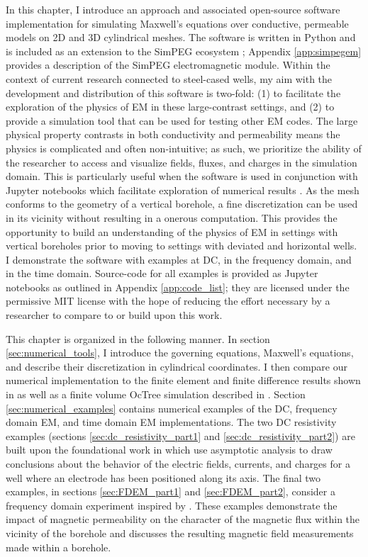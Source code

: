 In this chapter, I introduce an approach and associated open-source software implementation for simulating Maxwell’s equations over conductive, permeable models on 2D and 3D cylindrical meshes. The software is written in Python \citep{van1995python} and is included as an extension to the SimPEG ecosystem \citep{Cockett2015}; Appendix \ref{app:simpegem} provides a description of the SimPEG electromagnetic module. Within the context of current research connected to steel-cased wells, my aim with the development and distribution of this software is two-fold: (1) to facilitate the exploration of the physics of EM in these large-contrast settings, and (2) to provide a simulation tool that can be used for testing other EM codes. The large physical property contrasts in both conductivity and permeability means the physics is complicated and often non-intuitive; as such, we prioritize the ability of the researcher to access and visualize fields, fluxes, and charges in the simulation domain. This is particularly useful when the software is used in conjunction with Jupyter notebooks which facilitate exploration of numerical results \citep{Perez2015}. As the mesh conforms to the geometry of a vertical borehole, a fine discretization can be used in its vicinity without resulting in a onerous computation. This provides the opportunity to build an understanding of the physics of EM in settings with vertical boreholes prior to moving to settings with deviated and horizontal wells. I demonstrate the software with examples at DC, in the frequency domain, and in the time domain. Source-code for all examples is provided as Jupyter notebooks as outlined in Appendix \ref{app:code_list}; they are licensed under the permissive MIT license with the hope of reducing the effort necessary by a researcher to compare to or build upon this work.

This chapter is organized in the following manner. In section \ref{sec:numerical_tools}, I introduce the governing equations, Maxwell’s equations, and describe their discretization in cylindrical coordinates. I then compare our numerical implementation to the finite element and finite difference results shown in \citep{Commer2015} as well as a finite volume OcTree simulation described in \citep{Haber2007}. Section \ref{sec:numerical_examples} contains numerical examples of the DC, frequency domain EM, and time domain EM implementations. The two DC resistivity examples (sections \ref{sec:dc_resistivity_part1} and \ref{sec:dc_resistivity_part2}) are built upon the foundational work in \citep{Kaufman1990, Kaufman1993} which use asymptotic analysis to draw conclusions about the behavior of the electric fields, currents, and charges for a well where an electrode has been positioned along its axis.  The final two examples, in sections \ref{sec:FDEM_part1} and \ref{sec:FDEM_part2}, consider a frequency domain experiment inspired by \citep{Augustin1989}. These examples demonstrate the impact of magnetic permeability on the character of the magnetic flux within the vicinity of the borehole and discusses the resulting magnetic field measurements made within a borehole.
